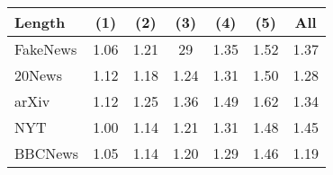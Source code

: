 \small
\begin{tabular}{l|cccccc}
\toprule
Length   & (1) & (2) & (3)   &  (4) &  (5)  & All\\
\midrule
FakeNews &1.06 &1.21 &29 &1.35 &1.52 &1.37 \\
20News &1.12 &1.18 &1.24 &1.31 &1.50 &1.28 \\
arXiv &1.12 &1.25 &1.36 &1.49 &1.62 &1.34\\
NYT &1.00 &1.14 &1.21 &1.31 &1.48 &1.45\\
BBCNews &1.05 &1.14 &1.20 &1.29 &1.46 &1.19 \\
\bottomrule
\end{tabular}